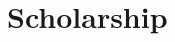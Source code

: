 \documentclass[12pt, letterpaper, sans]{moderncv}
\begin{document}

\section{Scholarship}
\end{document}
